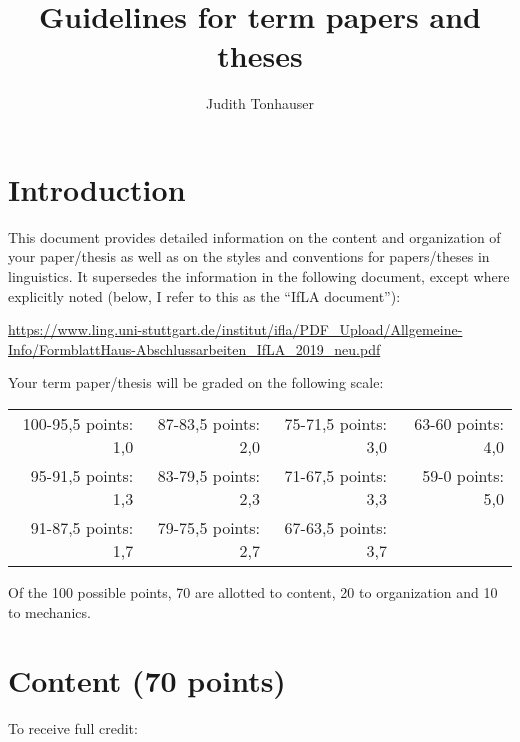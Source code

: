 \documentclass[11pt,fleqn,a4paper/thesis]{article}
\title{Guidelines for term papers and theses}
\author{Judith Tonhauser}
\affil{University of Stuttgart}
\newcommand{\6}{\mbox{$[\hspace*{-.6mm}[$}}
\newcommand{\9}{\mbox{$]\hspace*{-.6mm}]$}}
\begin{document}
\maketitle

\section{Introduction}

This document provides detailed information on the content and organization of your paper/thesis as well as on the styles and conventions for papers/theses in linguistics. It supersedes the information in the following document, except where explicitly noted (below, I refer to this as the ``IfLA document''):

\url{https://www.ling.uni-stuttgart.de/institut/ifla/PDF_Upload/Allgemeine-Info/FormblattHaus-Abschlussarbeiten_IfLA_2019_neu.pdf}

Your term paper/thesis will be graded on the following scale: 

\setlength{\tabcolsep}{20pt}
\begin{tabular}{rrrr}
100-95,5 points: 1,0 & 87-83,5 points: 2,0 & 75-71,5 points: 3,0 & 63-60 points: 4,0  \\ 
95-91,5 points: 1,3 & 83-79,5 points: 2,3  & 71-67,5 points: 3,3 & 59-0 points: 5,0 \\
91-87,5 points: 1,7 & 79-75,5 points: 2,7 & 67-63,5 points: 3,7 & \\
\end{tabular}

Of the 100 possible points, 70 are allotted to content, 20 to organization and 10 to mechanics.

\section{Content (70 points)}

To receive full credit:
\end{document}
